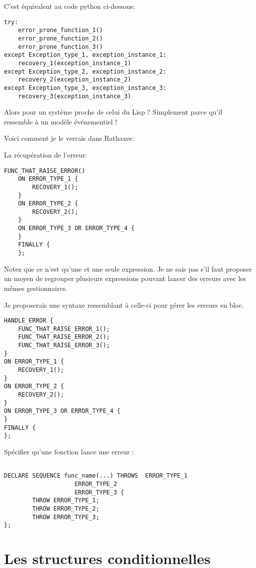 \documentclass{rtxreport}
\begin{document}
C'est équivalent au code python ci-dessous:
\lstset{language=Python}
\begin{lstlisting}
try:
	error_prone_function_1()
	error_prone_function_2()
	error_prone_function_3()
except Exception_type_1, exception_instance_1:
	recovery_1(exception_instance_1)
except Exception_type_2, exception_instance_2:
	recovery_2(exception_instance_2)
except Exception_type_3, exception_instance_3:
	recovery_3(exception_instance_3)
\end{lstlisting}

\lstset{language=rathaxes}

Alors pour un système proche de celui du Lisp ?
Simplement parce qu'il ressemble à un modèle événementiel !

Voici comment je le verrais dans Rathaxes:

La récupération de l'erreur:
\begin{lstlisting}
FUNC_THAT_RAISE_ERROR()
	ON ERROR_TYPE_1 {
		RECOVERY_1();
	}
	ON ERROR_TYPE_2 {
		RECOVERY_2();
	}
	ON ERROR_TYPE_3 OR ERROR_TYPE_4 {
	}
	FINALLY {
	};
\end{lstlisting}

Notez que ce n’est qu’une et une seule expression. Je ne sais pas s’il faut proposer un moyen de regrouper plusieurs expressions pouvant lancer des erreurs avec les mêmes gestionnaires.

Je proposerais une syntaxe ressemblant à celle-ci pour gérer les erreurs en bloc.

\begin{lstlisting}
HANDLE_ERROR {
	FUNC_THAT_RAISE_ERROR_1();
	FUNC_THAT_RAISE_ERROR_2();
	FUNC_THAT_RAISE_ERROR_3();
}
ON ERROR_TYPE_1 {
	RECOVERY_1();
}
ON ERROR_TYPE_2 {
	RECOVERY_2();
}
ON ERROR_TYPE_3 OR ERROR_TYPE_4 {
}
FINALLY {
};
\end{lstlisting}

Spécifier qu’une fonction lance une erreur :

\begin{lstlisting}

DECLARE SEQUENCE func_name(...) THROWS	ERROR_TYPE_1
					ERROR_TYPE_2
					ERROR_TYPE_3 {
		THROW ERROR_TYPE_1;
		THROW ERROR_TYPE_2;
		THROW ERROR_TYPE_3;
};

\end{lstlisting}


\chapter{Les structures conditionnelles}
\end{document}
